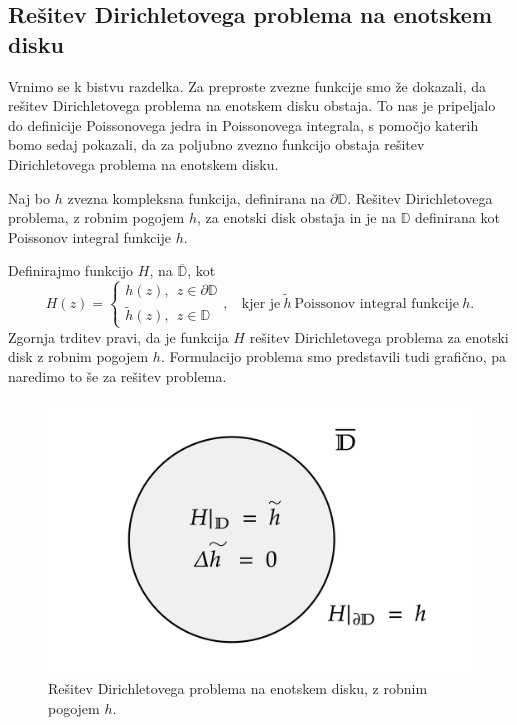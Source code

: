 \documentclass[mat1, tisk]{fmfdelo}
\begin{document}
\subsection{Rešitev Dirichletovega problema na enotskem disku}
    Vrnimo se k bistvu razdelka. Za preproste zvezne funkcije smo že dokazali, da rešitev Dirichletovega problema na enotskem disku obstaja. To nas je pripeljalo do definicije Poissonovega jedra in Poissonovega integrala, s pomočjo katerih bomo sedaj pokazali, da za poljubno zvezno funkcijo obstaja rešitev Dirichletovega problema na enotskem disku.
    \begin{trditev}
        \label{obstoj}
        Naj bo $h$ zvezna kompleksna funkcija, definirana na $\partial \mathbb{D}$. Rešitev Dirichletovega problema, z robnim pogojem $h$, za enotski disk obstaja in je na $\mathbb{D}$ definirana kot Poissonov integral funkcije $h$.
    \end{trditev}
    \begin{opomba}
        \label{opomba_obstoj}
        Definirajmo funkcijo $H$, na $\overline{\mathbb{D}}$, kot
        $$
            H(z) = \begin{cases}
                    h(z),~~z \in \partial \mathbb{D}\\
                    \widetilde{h}(z),~~z \in \mathbb{D}
            \end{cases},~~~~\text{kjer je}~\widetilde{h}~\text{Poissonov integral funkcije}~h.
        $$
        Zgornja trditev pravi, da je funkcija $H$ rešitev Dirichletovega problema za enotski disk z robnim pogojem $h$. 
        Formulacijo problema smo predstavili tudi grafično, pa naredimo to še za rešitev problema. 
        \begin{figure}[H]
            \begin{center}
                \includegraphics[width = 0.6 \textwidth]{dirichlet_resitev.png}
                \caption{Rešitev Dirichletovega problema na enotskem disku, z robnim pogojem $h$.}
            \end{center}    
        \end{figure}
     \end{opomba}
\end{document}
